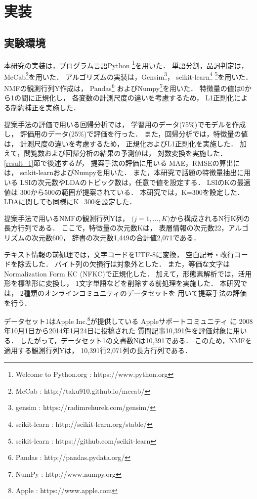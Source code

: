 \documentclass[12pt,a4paper,twocolumn,twoside]{jsik}
\begin{document}
\section{実装}
\subsection{実験環境}\label{simulation}
本研究の実装は，プログラム言語Python
\footnote{Welcome to Python.org : https://www.python.org}を用いた．
単語分割，品詞判定は，MeCab\footnote{MeCab : http://taku910.github.io/mecab/}を用いた．
%
アルゴリズムの実装は，Gensim\footnote{gensim : https://radimrehurek.com/gensim/}，
scikit-learn\footnote{scikit-learn : http://scikit-learn.org/stable/}
\footnote{scikit-learn : https://github.com/scikit-learn}を用いた．
%
NMFの観測行列Y作成は，
Pandas\footnote{Pandas : http://pandas.pydata.org/}
およびNumpy\footnote{NumPy : http://www.numpy.org}を用いた．
%
特徴量の値は0から1の間に正規化し，
各変数の計測尺度の違いを考慮するため，
L1正則化による制約補正を実施した．

提案手法の評価で用いる回帰分析では，
学習用のデータ(75\%)でモデルを作成し，
評価用のデータ(25\%)で評価を行った．
%
また，回帰分析では，特徴量の値は，
計測尺度の違いを考慮するため，
正規化およびL1正則化を実施した．
加えて，閲覧数および回帰分析の結果の予測値は，
対数変換を実施した．
%
\ref{result_1}節で後述するが，
提案手法の評価に用いる
MAE，RMSEの算出には，
scikit-learnおよびNumpyを用いた．
%
また，本研究で話題の特徴量抽出に用いる
LSIの次元数やLDAのトピック数は，任意で値を設定する．
%
LSIのKの最適値は
300から500の範囲が提案されている\cite{lsi_required}．
本研究では，K=300を設定した．
%
LDAに関しても同様にK=300を設定した．

提案手法で用いるNMFの観測行列Yは，
$\big(j = 1, \ldots ,K \big)$から構成されるN行K列の長方行列である．
ここで，特徴量の次元数Kは，
表層情報の次元数22，アルゴリズムの次元数600，
辞書の次元数1,449の合計値2,071である．

テキスト情報の前処理では，文字コードをUTF-8に変換，
空白記号・改行コードを除去した．
バイト列の欠損行は対象外とした．
%
また，等価な文字はNormalization Form KC (NFKC)で正規化した．
加えて，形態素解析では，活用形を標準形に変換し，
1文字単語などを削除する前処理を実施した．
%
本研究では，
2種類のオンラインコミュニティのデータセットを
用いて提案手法の評価を行う．

データセット1はApple Inc.\footnote{Apple : https://www.apple.com}が提供している
Appleサポートコミュニティ
\cite{Apple}に
2008年10月1日から2014年1月24日に投稿された
質問記事10,391件を評価対象に用いる．
%
したがって，データセット1の文書数Nは10,391である．
このため，NMFを適用する観測行列Yは，
10,391行2,071列の長方行列である．
\end{document}
